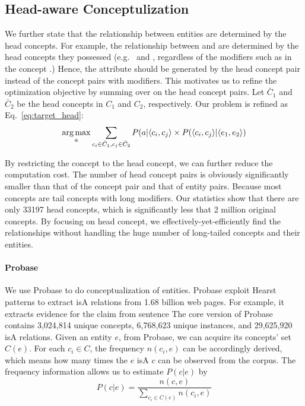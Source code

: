 \subsection{Head-aware Conceptulization}
We further state that the relationship between entities are determined by the head concepts.
For example, the  relationship between  and  are determined by the head concepts they possessed (e.g.\  and , regardless of the modifiers such as  in the concept .)
Hence, the attribute should be generated by the head concept pair instead of the concept pairs with modifiers.
This motivates us to refine the optimization objective by summing over on the head concept pairs.
Let $\bar{C}_1$ and $\bar{C}_2$ be the head concepts in  $C_1$ and $C_2$, respectively.
Our problem is refined as Eq.~\ref{eq:target_head}:
\begin{equation}
\label{eq:target_head}
\operatorname*{arg\,max}_a \sum_{c_i\in \bar{C}_1 , c_j \in \bar{C}_2 } P(a|\langle c_{i},c_{j} \rangle \times P(\langle c_{i},c_{j}\rangle|\langle e_{1},e_{2}\rangle)
\end{equation}

By restricting the concept to the head concept, we can further reduce the computation cost.
The number of head concept pairs is obviously significantly smaller than that of the concept pair and that of entity pairs. 
Because most concepts are tail concepts with long modifiers.
Our statistics show that there are only 33197 head concepts, which is significantly less that 2 million original concepts.
By focusing on head concept, we effectively-yet-efficiently find the relationships without handling the huge number of long-tailed concepts and their entities.

\paragraph*{Probase}
We use Probase to do conceptualization of entities.  Probase exploit Hearst patterns to extract isA relations from 1.68 billion web pages. For example, it extracts evidence for the claim  from sentence 
The core version of Probase contains 3,024,814 unique concepts, 6,768,623 unique instances, and 29,625,920 isA relations.
Given an entity $e$, from Probase, we can acquire its concepts' set $C(e)$.
For each $c_i \in C$, the frequency $n(c_i,e)$ can be accordingly derived, which means how many times the $e$ isA $c$ can be observed from the corpus.
The frequency information allows us to estimate  $P(c|e)$ by
$$P(c|e)=\frac{n(c,e)}{\sum_{c_i\in C(e)}n(c_i, e)}$$

